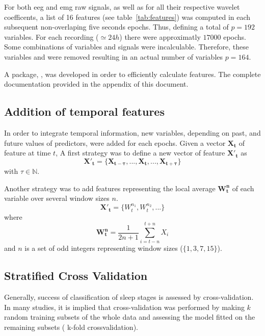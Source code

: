 For both \gls{eeg} and \gls{emg} raw signals, as well as for all their respective wavelet coefficents,
a list of 16 features (see table~\ref{tab:features}) was computed in each subsequent non-overlaping five seconds epochs.
Thus, defining a total of $p=192$ variables. For each recording ($\simeq 24h$) there were approximatly $17000$ epochs. 
Some combinations of variables and signals were incalculable.
Therefore, these variables and were removed resulting in an actual number of variables $p=164$.



A \py{} package, \pr{}, was developed in order to efficiently calculate features. The complete documentation provided in the appendix of this document.

\subsection{Addition of temporal features}
In order to integrate temporal information, new variables, depending on past, and future values of predictors, were added for each epochs.
Given a vector $\mathbf{X_t}$ of feature at time $t$,
A first strategy was to define a new vector of feature $\mathbf{{X'}_t}$ as
\begin{equation}
\mathbf{{X'}_t} = \{\mathbf{X_{t-\tau}}, ..., \mathbf{X_t}, ..., \mathbf{X_{t+\tau}}\}
\label{eq:tau}
\end{equation}
with $\tau \in \mathbb{N}$.

Another strategy was to add features representing the local average $\mathbf{W^n_t}$ of each variable over several window sizes $n$.
\begin{equation}
\mathbf{{X'}_t} = \{W^{n_1}_t, W^{n_2}_t, ...\}
\label{eq:window}
\end{equation}
where
\[
\mathbf{W^n_t} = \frac{1}{2n+1} \sum_{i = t-n}^{t+n}{X_i}
\]
and $n$ is a set of odd integers representing window sizes (\eg $\{1,3,7,15\}$).



\subsection{Stratified Cross Validation}
Generally, success of classification of sleep stages is assessed by cross-validation.
In many studies\citationneeded{}, it is implied that cross-validation was performed by making $k$ random training subsets 
of the whole data and assessing the model fitted on the remaining subsets (\ie{} k-fold crossvalidation).

